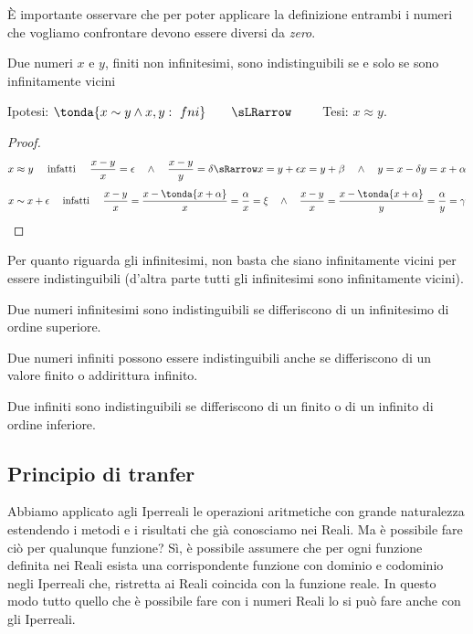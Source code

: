 \begin{osservazione}
 È importante osservare che per poter applicare la definizione entrambi i 
numeri che vogliamo confrontare devono essere diversi da \emph{zero}.
\end{osservazione}

\begin{teorema}
Due numeri $x$ e $y$, finiti non infinitesimi, sono indistinguibili se e solo 
se 
sono infinitamente vicini
\end{teorema}
\begin{center}
Ipotesi: $\tonda{x \sim y \wedge x,y:\ fni}\qquad \sLRarrow\qquad$ Tesi: 
$x\approx y$.
\end{center}

\begin{proof}
\[x \approx y \quad \text{ infatti } \quad
\frac{x-y}{x} = \epsilon \quad \wedge \quad 
\frac{x-y}{y} = \delta \sRarrow x=y+\epsilon x=y+\beta \quad \wedge \quad 
y=x-\delta y=x+\alpha
\]
\[x \sim x+\epsilon \quad \text{ infatti } \quad
\frac{x-y}{x}=\frac{x-\tonda{x+\alpha}}{x} = \frac{\alpha}{x}= \xi \quad 
\wedge \quad 
\frac{x-y}{x}=\frac{x-\tonda{x+\alpha}}{y} = \frac{\alpha}{y}= \gamma
\]
\end{proof}

Per quanto riguarda gli infinitesimi, non basta che siano infinitamente 
vicini 
per essere indistinguibili (d'altra parte tutti gli infinitesimi sono 
infinitamente vicini).

\begin{teorema}
Due numeri infinitesimi sono indistinguibili se differiscono di un 
infinitesimo di ordine superiore.
\end{teorema}

Due numeri infiniti possono essere indistinguibili anche se differiscono di 
un 
valore finito o addirittura infinito. 

\begin{teorema}
Due infiniti sono indistinguibili se 
differiscono di un finito o di un infinito di ordine inferiore.
\end{teorema}

\subsection{Principio di tranfer}
\label{subsec:insnum_nonarchimedei}

Abbiamo applicato agli Iperreali le operazioni aritmetiche con grande 
naturalezza estendendo i metodi e i risultati che già conosciamo nei Reali. 
Ma è possibile fare ciò per qualunque funzione? 
Sì, è possibile assumere che per ogni funzione definita nei Reali esista una 
corrispondente funzione con dominio e codominio negli Iperreali che, 
ristretta 
ai Reali coincida con la funzione reale.
In questo modo tutto quello che è possibile fare con i numeri Reali lo si può 
fare anche con gli Iperreali.

